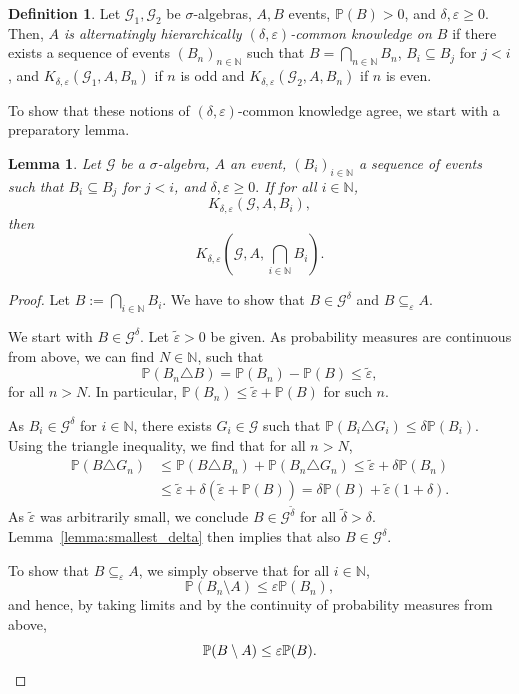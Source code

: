 \documentclass[a4paper, 10pt]{article}
\numberwithin{theorem}{section}
\newtheorem{lemma}[theorem]{Lemma}
\theoremstyle{definition}
\newtheorem{definition}[theorem]{Definition}
\newcommand{\N}{\mathbb{N}}
\newcommand{\G}{\mathcal{G}}
\renewcommand{\epsilon}{\varepsilon}
\renewcommand{\P}{\mathbb{P}}
\begin{document}
\begin{definition}
	Let $\G_1,\G_2$ be $\sigma$-algebras, $A,B$ events, $\P(B)>0$, and $\delta,\epsilon \geq 0$. Then,  \emph{$A$ is alternatingly hierarchically $(\delta,\epsilon)$-common knowledge on $B$} if there exists a sequence of events $(B_n)_{n\in \N}$ such that $B=\bigcap_{n\in \N} B_n$,  $B_i \subseteq B_j$ for $j < i$, and $K_{\delta,\epsilon}(\G_1, A,B_n)$ if $n$ is odd and  $K_{\delta,\epsilon}(\G_2, A,B_n)$ if $n$ is even.
\end{definition}

To show that these notions of $(\delta,\epsilon)$-common knowledge agree, we start with a preparatory lemma.

\begin{lemma}\label{lemma:falling_sequence}
	Let $\G$ be a $\sigma$-algebra, $A$ an event, $(B_i)_{i\in \N}$ a sequence of events such that $B_i \subseteq B_j$ for $j<i$, and $\delta, \epsilon \geq 0.$ If for all $i\in \N$,
	$$ K_{\delta,\epsilon}(\G, A,B_i),$$
	then
	$$K_{\delta,\epsilon}\left(\G, A, \bigcap_{i\in \N} B_i\right).$$
\end{lemma}

\begin{proof}
	Let $B:= \bigcap_{i\in \N}B_i.$ We have to show that $B \in \G^\delta$ and $B \subseteq_\epsilon A.$
	
	We start with $B \in \G^\delta$. Let $\tilde{\epsilon} >0$ be given. As probability measures are continuous from above, we can find $N \in \N$, such that
	$$\P(B_n \triangle B) = \P(B_n)- \P(B) \leq \tilde{\epsilon},$$
	for all $n > N$.
	In particular, $\P(B_n) \leq \tilde{\epsilon} + \P(B)$ for such $n$.
	
	As $B_i \in \G^\delta$ for $i \in \N$, there exists $G_i \in \G$ such that $\P(B_i \triangle G_i) \leq \delta \P(B_i).$
	Using the triangle inequality, we find that for all $n > N$,
	\begin{align*}
		\P(B \triangle G_n) &\leq \P(B \triangle B_n) + \P(B_n \triangle G_n) \leq \tilde{\epsilon} + \delta \P(B_n) \\
		&\leq \tilde{\epsilon} + \delta (\tilde{\epsilon} + \P(B))= \delta \P(B) + \tilde{\epsilon}(1+\delta).
	\end{align*}
	As $\tilde{\epsilon}$ was arbitrarily small, we conclude $B \in \G^{\tilde{\delta}}$ for all $\tilde{\delta}> \delta$. Lemma~\ref{lemma:smallest_delta} then implies that also $B \in \G^\delta$.
	
	To show that $B \subseteq_\epsilon A$, we simply observe that for all $i \in \N$,
	$$
	\P(B_n \setminus A) \leq \epsilon \P(B_n), 
	$$
	and hence, by taking limits and by the continuity of probability measures from above, 
	\[\P(B\setminus A) \leq \epsilon \P(B). \qedhere \]
\end{proof}
\end{document}
